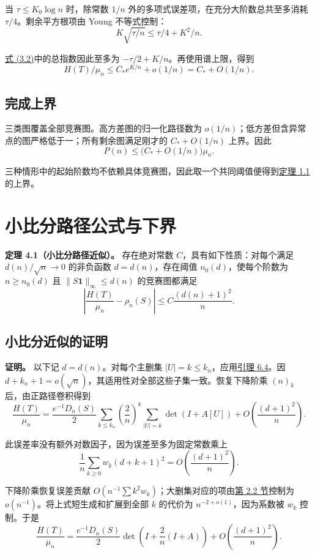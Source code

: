 \documentclass[11pt,a4paper]{article}
\makeatletter
\newcommand{\paperstatement}[3]{\par\addvspace{6pt}\Needspace{4\baselineskip}\phantomsection\def\@currentlabel{#2}\label{#3}\noindent\textbf{#1}\enspace}
\newcommand{\paperref}[2]{\hyperref[#1]{#2}}
\makeatother
\begin{document}
当 \(\tau\le K_0\log n\) 时，除常数 \(1/n\) 外的多项式误差项，在充分大阶数总共至多消耗 \(\tau/4\)。剩余平方根项由 Young 不等式控制：
\[K\sqrt{\tau/n}\le\tau/4+K^2/n.\]

\paperref{eq-score-penalty}{式 (3.2)}中的总指数因此至多为 \(-\tau/2+K/n\)。再使用谱上限，得到
\[H(T)/\mu_n\le C_*e^{K/n}+o(1/n)=C_*+O(1/n).\]

\subsection{完成上界}\label{sec-3.5}

三类图覆盖全部竞赛图。高方差图的归一化路径数为 \(o(1/n)\)；低方差但含异常点的图严格低于一；所有剩余图满足刚才的 \(C_*+O(1/n)\) 上界。因此
\[\boxed{P(n)\le\bigl(C_*+O(1/n)\bigr)\mu_n.}\]

三种情形中的起始阶数均不依赖具体竞赛图，因此取一个共同阈值便得到\paperref{thm-1.1}{定理 1.1} 的上界。

\section{小比分路径公式与下界}\label{sec-4}

\paperstatement{定理 4.1（小比分路径近似）。}{4.1}{thm-4.1} 存在绝对常数 \(C\)，具有如下性质：对每个满足 \(d(n)/\sqrt n\to0\) 的非负函数 \(d=d(n)\)，存在阈值 \(n_0(d)\)，使每个阶数为 \(n\ge n_0(d)\) 且 \(\|S\mathbf1\|_\infty\le d(n)\) 的竞赛图都满足
\[\left|\frac{H(T)}{\mu_n}-\rho_n(S)\right|\le C\frac{(d(n)+1)^2}{n}.\]

\subsection{小比分近似的证明}\label{sec-4.1}

\textbf{证明。} 以下记 \(d=d(n)\)。对每个主删集 \(|U|=k\le k_n\)，应用\paperref{thm-6.4}{引理 6.4}。因 \(d+k_n+1=o(\sqrt n)\)，其适用性对全部这些子集一致。恢复下降阶乘 \((n)_k\) 后，由正路径卷积得到
\[\frac{H(T)}{\mu_n}
=\frac{e^{-1}D_n(S)}2
\sum_{k\le k_n}\left(\frac2n\right)^k
\sum_{|U|=k}\det(I+A[U])
+O\left(\frac{(d+1)^2}{n}\right).\]

此误差率没有额外对数因子，因为误差至多为固定常数乘上
\[\frac1n\sum_{k\ge0}w_k(d+k+1)^2
=O\left(\frac{(d+1)^2}{n}\right).\]

下降阶乘恢复误差贡献 \(O(n^{-1}\sum k^2w_k)\)；大删集对应的项由\paperref{sec-2.2}{第 2.2 节}控制为 \(o(n^{-1})\)。将上式短生成和扩展到全部 \(k\) 的代价为 \(n^{-2+o(1)}\)，因为系数被 \(w_k\) 控制。于是
\[\frac{H(T)}{\mu_n}
=\frac{e^{-1}D_n(S)}2
\det\left(I+\frac2n(I+A)\right)
+O\left(\frac{(d+1)^2}{n}\right).\]
\end{document}
